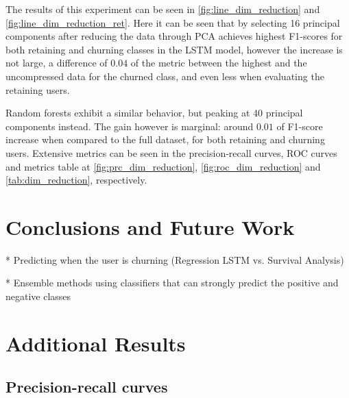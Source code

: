 \documentclass{kththesis}
\begin{document}
The results of this experiment can be seen in \autoref{fig:line_dim_reduction} and \autoref{fig:line_dim_reduction_ret}. Here it can be seen that by selecting 16 principal components after reducing the data through PCA achieves highest F1-scores for both retaining and churning classes in the LSTM model, however the increase is not large, a difference of $0.04$ of the metric between the highest and the uncompressed data for the churned class, and even less when evaluating the retaining users.

Random forests exhibit a similar behavior, but peaking at 40 principal components instead. The gain however is marginal: around $0.01$ of F1-score increase when compared to the full dataset, for both retaining and churning users. Extensive metrics can be seen in the precision-recall curves, ROC curves and metrics table at \autoref{fig:prc_dim_reduction}, \autoref{fig:roc_dim_reduction} and \autoref{tab:dim_reduction}, respectively.

\chapter{Conclusions and Future Work}

* Predicting when the user is churning (Regression LSTM vs. Survival Analysis)

* Ensemble methods using classifiers that can strongly predict the positive and negative classes



\appendix

\chapter{Additional Results}
\label{chap:add_results}

\section{Precision-recall curves}
\end{document}
